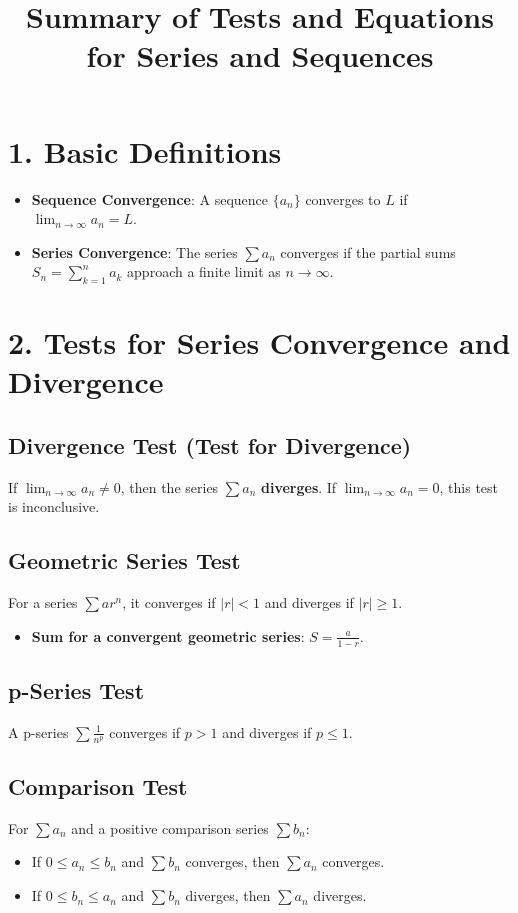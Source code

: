 \documentclass{article}
\title{Summary of Tests and Equations for Series and Sequences}
\author{}
\date{}
\begin{document}
\maketitle

\section*{1. Basic Definitions}

\begin{itemize}
    \item \textbf{Sequence Convergence}: A sequence $\{a_n\}$ converges to $L$ if $\lim_{n \to \infty} a_n = L$.
    \item \textbf{Series Convergence}: The series $\sum a_n$ converges if the partial sums $S_n = \sum_{k=1}^n a_k$ approach a finite limit as $n \to \infty$.
\end{itemize}

\section*{2. Tests for Series Convergence and Divergence}

\subsection*{Divergence Test (Test for Divergence)}
If $\lim_{n \to \infty} a_n \neq 0$, then the series $\sum a_n$ \textbf{diverges}. If $\lim_{n \to \infty} a_n = 0$, this test is inconclusive.

\subsection*{Geometric Series Test}
For a series $\sum ar^n$, it converges if $|r| < 1$ and diverges if $|r| \geq 1$.
\begin{itemize}
    \item \textbf{Sum for a convergent geometric series}: $S = \frac{a}{1 - r}$.
\end{itemize}

\subsection*{p-Series Test}
A p-series $\sum \frac{1}{n^p}$ converges if $p > 1$ and diverges if $p \leq 1$.

\subsection*{Comparison Test}
For $\sum a_n$ and a positive comparison series $\sum b_n$:
\begin{itemize}
    \item If $0 \leq a_n \leq b_n$ and $\sum b_n$ converges, then $\sum a_n$ converges.
    \item If $0 \leq b_n \leq a_n$ and $\sum b_n$ diverges, then $\sum a_n$ diverges.
\end{itemize}
\end{document}
